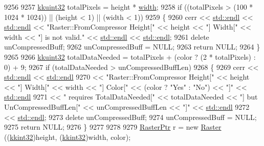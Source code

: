 \begin{DoxyCode}
9256 
9257   \hyperlink{namespace_k_k_b_af8d832f05c54994a1cce25bd5743e19a}{kkuint32}  totalPixels = height * \hyperlink{class_k_k_b_1_1_raster_ae0bcc103e191c3421d7692dc69ceb554}{width};
9258   \textcolor{keywordflow}{if}  ((totalPixels > (100 * 1024 * 1024))  ||  (height < 1)  ||  (width < 1))
9259   \{
9260     cerr << \hyperlink{namespace_k_k_b_ad1f50f65af6adc8fa9e6f62d007818a8}{std::endl} << \hyperlink{namespace_k_k_b_ad1f50f65af6adc8fa9e6f62d007818a8}{std::endl} << \textcolor{stringliteral}{"Raster::FromCompressor  Height["} << height << \textcolor{stringliteral}{"] 
       Width["} << width << \textcolor{stringliteral}{"]  is not valid."} << \hyperlink{namespace_k_k_b_ad1f50f65af6adc8fa9e6f62d007818a8}{std::endl} << \hyperlink{namespace_k_k_b_ad1f50f65af6adc8fa9e6f62d007818a8}{std::endl};
9261     \textcolor{keyword}{delete}  unCompressedBuff;
9262     unCompressedBuff = NULL;
9263     \textcolor{keywordflow}{return} NULL;
9264   \}
9265 
9266   \hyperlink{namespace_k_k_b_af8d832f05c54994a1cce25bd5743e19a}{kkuint32}  totalDataNeeded = totalPixels + (color ? (2 * totalPixels) : 0) + 9;
9267   \textcolor{keywordflow}{if}  (totalDataNeeded > unCompressedBuffLen)
9268   \{
9269     cerr << \hyperlink{namespace_k_k_b_ad1f50f65af6adc8fa9e6f62d007818a8}{std::endl} << \hyperlink{namespace_k_k_b_ad1f50f65af6adc8fa9e6f62d007818a8}{std::endl} 
9270          << \textcolor{stringliteral}{"Raster::FromCompressor  Height["} << height << \textcolor{stringliteral}{"]  Width["} << width << \textcolor{stringliteral}{"]  Color["} << (color ? \textcolor{stringliteral}{
      "Yes"} : \textcolor{stringliteral}{"No"}) << \textcolor{stringliteral}{"]"} << \hyperlink{namespace_k_k_b_ad1f50f65af6adc8fa9e6f62d007818a8}{std::endl}
9271          << \textcolor{stringliteral}{"              requires TotalDataNeeded["} << totalDataNeeded << \textcolor{stringliteral}{"]  but UnCompressedBuffLen["} 
      << unCompressedBuffLen << \textcolor{stringliteral}{"]"} << \hyperlink{namespace_k_k_b_ad1f50f65af6adc8fa9e6f62d007818a8}{std::endl}
9272          << \hyperlink{namespace_k_k_b_ad1f50f65af6adc8fa9e6f62d007818a8}{std::endl};
9273     \textcolor{keyword}{delete}  unCompressedBuff;
9274     unCompressedBuff = NULL;
9275     \textcolor{keywordflow}{return} NULL;
9276   \}
9277 
9278 
9279   \hyperlink{class_k_k_b_1_1_raster}{RasterPtr}  r = \textcolor{keyword}{new} \hyperlink{class_k_k_b_1_1_raster_a19ec88efff547c1fcda863172fef620b}{Raster} ((\hyperlink{namespace_k_k_b_a8fa4952cc84fda1de4bec1fbdd8d5b1b}{kkint32})height, (\hyperlink{namespace_k_k_b_a8fa4952cc84fda1de4bec1fbdd8d5b1b}{kkint32})width, color);

\end{DoxyCode}
